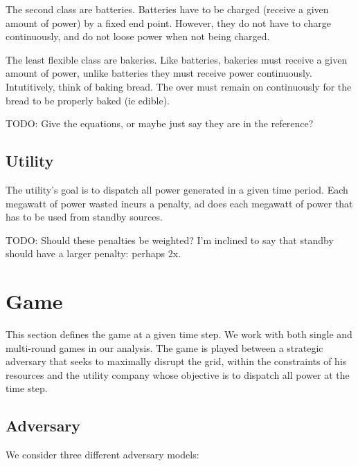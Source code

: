 \documentclass[conference]{IEEEtran}
\begin{document}
The second class are batteries.  Batteries have to be charged (receive a given amount of power) by a fixed end point.  However,
they do not have to charge continuously, and do not loose power when not being charged.

The least flexible class are bakeries.  Like batteries, bakeries must receive a given amount of power, unlike batteries they
must receive power continuously.  Intutitively, think of baking bread.  The over must remain on continuously for the bread
to be properly baked (ie edible).

TODO: Give the equations, or maybe just say they are in the reference?

\subsection{Utility}

The utility's goal is to dispatch all power generated in a given time period.  Each megawatt of power wasted incurs a penalty,
ad does each megawatt of power that has to be used from standby sources.

TODO: Should these penalties be weighted?  I'm inclined to say that standby should have a larger penalty: perhaps 2x.

\section{Game}

This section defines the game at a given time step.  We work with both single and multi-round games in our analysis.
The game is played between a strategic adversary that seeks to maximally disrupt the grid, within the constraints of his
resources and the utility company whose objective is to dispatch all power at the time step.   

\subsection{Adversary}

We consider three different adversary models:
\end{document}

